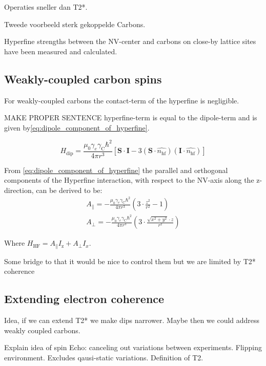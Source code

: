 Operaties sneller dan T2*.

Tweede voorbeeld sterk gekoppelde Carbons.

Hyperfine strengths between the NV-center and carbons on close-by lattice sites have been measured\citep{Smeltzer201113} and calculated\citep{Gali2008Ab,Gali2009Identification}.


\subsection{Weakly-coupled carbon spins}

For weakly-coupled carbons the contact-term of the hyperfine is negligible.

MAKE PROPER SENTENCE
hyperfine-term is equal to the dipole-term and is given by\cref{eq:dipole_component_of_hyperfine}\citep{Lange2012Quantum}.

\begin{equation}
\label{eq:dipole_component_of_hyperfine}
H_{\mathrm{dip}} = \frac{\mu_0 \gamma_e \gamma_{\mathrm{C}} \hbar^2 }{4 \pi r^3} [ \bm{S \cdot I} - 3 (\bm S \cdot \hat{n_{\mathrm{hf}}})(\bm I \cdot \hat{n_{\mathrm{hf}}})]
\end{equation}

From \cref{eq:dipole_component_of_hyperfine}  the parallel and orthogonal components of the Hyperfine interaction, with respect to the NV-axis along the z-direction, can be derived to be:
 \begin{eqnarray}
A_\parallel= - \frac{\mu_0 \gamma_e \gamma_{\mathrm{C}} \hbar^2 }{4 \pi r^3} \left(3\cdot \frac{z^2}{r^2}-1\right)\\
 A_\perp =  -\frac{\mu_0 \gamma_e \gamma_{\mathrm{C}} \hbar^2 }{4 \pi r^3}\left( 3\cdot\frac{\sqrt{x^2+y^2}\cdot z}{r^2}\right)
\end{eqnarray}

Where $H_{\mathrm{HF}} = A_\parallel I_\mathrm{z} + A_\perp I_x $.

Some bridge to that it would be nice to control them but we are limited by T2* coherence

\subsection{Extending electron coherence}
Idea, if we can extend T2* we make dips narrower. Maybe then we could address weakly coupled carbons.

Explain idea of spin Echo: canceling out variations between experiments. Flipping environment. Excludes qausi-static variations.
Definition of T2.

